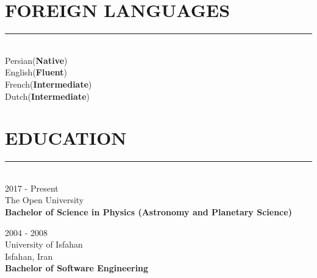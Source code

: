 \documentclass[10pt,a4paper]{article}
\begin{document}

\section{FOREIGN LANGUAGES}
\noindent \rule {18.0cm}{0.2pt} \\
    \textbullet \hspace{0.05cm} Persian(\textbf{Native}) \\
    \textbullet \hspace{0.05cm} English(\textbf{Fluent}) \\
    \textbullet \hspace{0.05cm} French(\textbf{Intermediate}) \\
    \textbullet \hspace{0.05cm} Dutch(\textbf{Intermediate}) \\

\section{EDUCATION}
\noindent \rule {18.0cm}{0.2pt} \\
\textbullet \hspace{0.1cm} 2017 - Present \\
The Open University \\
\textbf{Bachelor of Science in Physics (Astronomy and Planetary Science)}
\vspace{0.3cm}

\noindent \textbullet \hspace{0.1cm}  2004 - 2008 \\
University of Isfahan \\
Isfahan, Iran \\
\textbf{Bachelor of Software Engineering}
\end{document}
